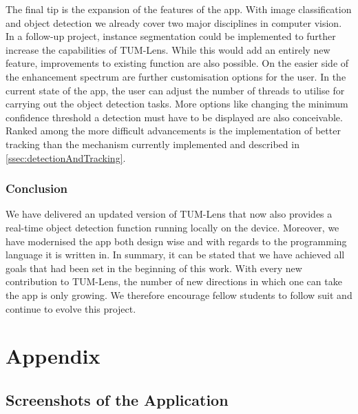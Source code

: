 \documentclass[
			   fontsize=11pt,
               paper=a4,
               bibliography=totoc,
               idxtotoc,
               headsepline,
               footsepline,
               footinclude=false,
               BCOR=12mm,
               DIV=13,
               openany,   %
               oneside    %
               ]
               {scrbook}
\begin{document}
The final tip is the expansion of the features of the app. With image classification and object detection we already cover two major disciplines in computer vision. In a follow-up project, instance segmentation could be implemented to further increase the capabilities of TUM-Lens. While this would add an entirely new feature, improvements to existing function are also possible. On the easier side of the enhancement spectrum are further customisation options for the user. In the current state of the app, the user can adjust the number of threads to utilise for carrying out the object detection tasks. More options like changing the minimum confidence threshold a detection must have to be displayed are also conceivable. Ranked among the more difficult advancements is the implementation of better tracking than the mechanism currently implemented and described in \autoref{ssec:detectionAndTracking}.

\section{Conclusion}

We have delivered an updated version of TUM-Lens that now also provides a real-time object detection function running locally on the device. Moreover, we have modernised the app both design wise and with regards to the programming language it is written in. In summary, it can be stated that we have achieved all goals that had been set in the beginning of this work. With every new contribution to TUM-Lens, the number of new directions in which one can take the app is only growing. We therefore encourage fellow students to follow suit and continue to evolve this project.


\appendix


\part{Appendix}


\chapter{Screenshots of the Application}
\end{document}

